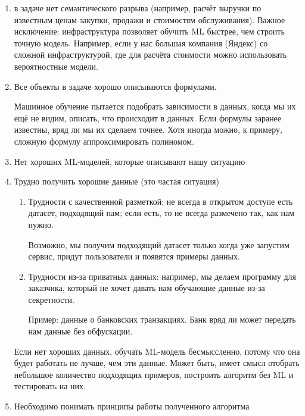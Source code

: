 \documentclass[main.tex]{subfiles}
\begin{document}
\begin{enumerate}[noitemsep]
    \item в задаче нет семантического разрыва (например, расчёт выручки по известным ценам закупки, продажи и стоимостям обслуживания).
    Важное исключение: инфраструктура позволяет обучить ML быстрее, чем строить точную модель.
    Например, если у нас большая компания (Яндекс) со сложной инфраструктурой, где для расчёта стоимости можно использовать вероятностные модели.
    \item Все объекты в задаче хорошо описываются формулами.

    Машинное обучение пытается подобрать зависимости в данных, когда мы их ещё не видим, описать, что происходит в данных.
    Если формулы заранее известны, вряд ли мы их сделаем точнее.
    Хотя иногда можно, к примеру, сложную формулу аппроксимировать полиномом.

    \item Нет хороших ML-моделей, которые описывают нашу ситуацию


    \item Трудно получить хорошие данные (это частая ситуация)
    \begin{enumerate}[noitemsep]
        \item Трудности с качественной разметкой: не всегда в открытом доступе есть датасет, подходящий нам; если есть, то не всегда размечено так, как нам нужно.

        Возможно, мы получим подходящий датасет только когда уже запустим сервис, придут пользователи и появятся примеры данных.
        \item Трудности из-за приватных данных: например, мы делаем программу для заказчика, который не хочет давать нам обучающие данные из-за секретности.

        Пример: данные о банковских транзакциях.
        Банк вряд ли может передать нам данные без обфускации.
    \end{enumerate}
    Если нет хороших данных, обучать ML-модель бесмыссленно, потому что она будет работать не лучше, чем эти данные.
    Может быть, имеет смысл отобрать небольшое количество подходящих примеров, построить алгоритм без ML и тестировать на них.

    \item Необходимо понимать принципы работы полученного алгоритма


\end{enumerate}
\end{document}

